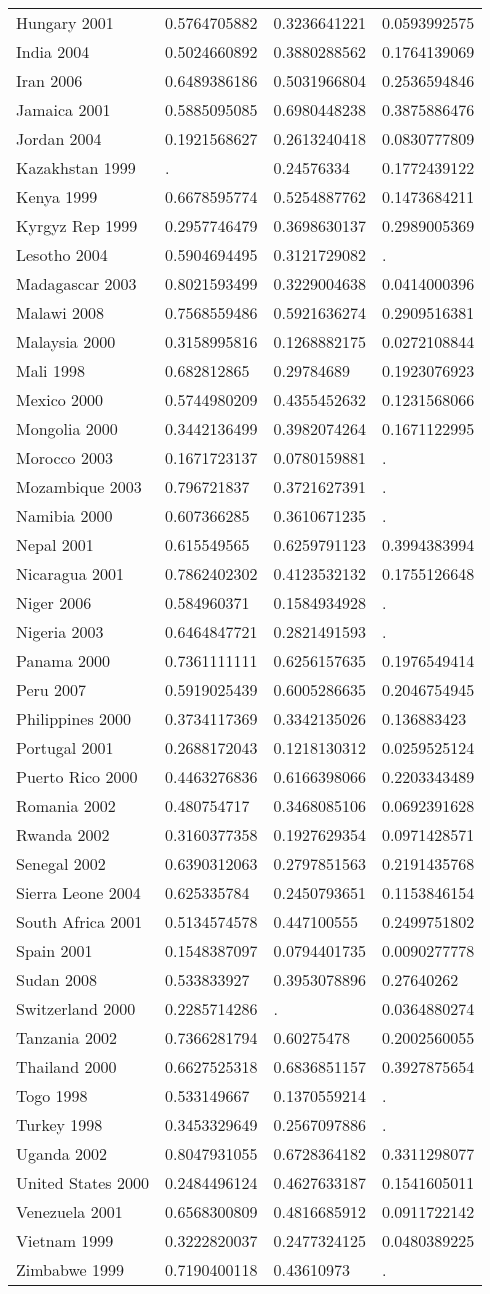\documentclass[a4paper]{article}
\begin{document}
\begin{longtable}{llll}
Hungary 2001&0.5764705882&0.3236641221&0.0593992575\tabularnewline
India 2004&0.5024660892&0.3880288562&0.1764139069\tabularnewline
Iran 2006&0.6489386186&0.5031966804&0.2536594846\tabularnewline
Jamaica 2001&0.5885095085&0.6980448238&0.3875886476\tabularnewline
Jordan 2004&0.1921568627&0.2613240418&0.0830777809\tabularnewline
Kazakhstan 1999&.&0.24576334&0.1772439122\tabularnewline
Kenya 1999&0.6678595774&0.5254887762&0.1473684211\tabularnewline
Kyrgyz Rep 1999&0.2957746479&0.3698630137&0.2989005369\tabularnewline
Lesotho 2004&0.5904694495&0.3121729082&.\tabularnewline
Madagascar 2003&0.8021593499&0.3229004638&0.0414000396\tabularnewline
Malawi 2008&0.7568559486&0.5921636274&0.2909516381\tabularnewline
Malaysia 2000&0.3158995816&0.1268882175&0.0272108844\tabularnewline
Mali 1998&0.682812865&0.29784689&0.1923076923\tabularnewline
Mexico 2000&0.5744980209&0.4355452632&0.1231568066\tabularnewline
Mongolia 2000&0.3442136499&0.3982074264&0.1671122995\tabularnewline
\newpage
Morocco 2003&0.1671723137&0.0780159881&.\tabularnewline
Mozambique 2003&0.796721837&0.3721627391&.\tabularnewline
Namibia 2000&0.607366285&0.3610671235&.\tabularnewline
Nepal 2001&0.615549565&0.6259791123&0.3994383994\tabularnewline
Nicaragua 2001&0.7862402302&0.4123532132&0.1755126648\tabularnewline
Niger 2006&0.584960371&0.1584934928&.\tabularnewline
Nigeria 2003&0.6464847721&0.2821491593&.\tabularnewline
Panama 2000&0.7361111111&0.6256157635&0.1976549414\tabularnewline
Peru 2007&0.5919025439&0.6005286635&0.2046754945\tabularnewline
Philippines 2000&0.3734117369&0.3342135026&0.136883423\tabularnewline
Portugal 2001&0.2688172043&0.1218130312&0.0259525124\tabularnewline
Puerto Rico 2000&0.4463276836&0.6166398066&0.2203343489\tabularnewline
Romania 2002&0.480754717&0.3468085106&0.0692391628\tabularnewline
Rwanda 2002&0.3160377358&0.1927629354&0.0971428571\tabularnewline
Senegal 2002&0.6390312063&0.2797851563&0.2191435768\tabularnewline
Sierra Leone 2004&0.625335784&0.2450793651&0.1153846154\tabularnewline
South Africa 2001&0.5134574578&0.447100555&0.2499751802\tabularnewline
Spain 2001&0.1548387097&0.0794401735&0.0090277778\tabularnewline
Sudan 2008&0.533833927&0.3953078896&0.27640262\tabularnewline
Switzerland 2000&0.2285714286&.&0.0364880274\tabularnewline
Tanzania 2002&0.7366281794&0.60275478&0.2002560055\tabularnewline
Thailand 2000&0.6627525318&0.6836851157&0.3927875654\tabularnewline
Togo 1998&0.533149667&0.1370559214&.\tabularnewline
Turkey 1998&0.3453329649&0.2567097886&.\tabularnewline
Uganda 2002&0.8047931055&0.6728364182&0.3311298077\tabularnewline
United States 2000&0.2484496124&0.4627633187&0.1541605011\tabularnewline
Venezuela 2001&0.6568300809&0.4816685912&0.0911722142\tabularnewline
Vietnam 1999&0.3222820037&0.2477324125&0.0480389225\tabularnewline
Zimbabwe 1999&0.7190400118&0.43610973&.\tabularnewline
\hline
 \end{longtable}
\end{document}
